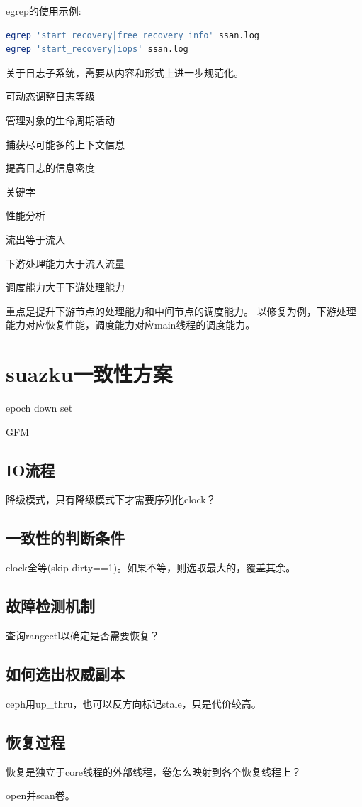 egrep的使用示例:
\begin{lstlisting}[language=bash,frame=single]
egrep 'start_recovery|free_recovery_info' ssan.log
egrep 'start_recovery|iops' ssan.log
\end{lstlisting}

关于日志子系统，需要从内容和形式上进一步规范化。
\begin{enumbox}
\item 可动态调整日志等级
\item 管理对象的生命周期活动
\item 捕获尽可能多的上下文信息
\item 提高日志的信息密度
\item 关键字
\end{enumbox}

性能分析
\begin{enumbox}
\item 流出等于流入
\item 下游处理能力大于流入流量
\item 调度能力大于下游处理能力
\end{enumbox}

重点是提升下游节点的处理能力和中间节点的调度能力。
以修复为例，下游处理能力对应恢复性能，调度能力对应main线程的调度能力。

\section{suazku一致性方案}

epoch down set

GFM

\subsection{IO流程}



降级模式，只有降级模式下才需要序列化clock？

\subsection{一致性的判断条件}

clock全等(skip dirty==1)。如果不等，则选取最大的，覆盖其余。

\subsection{故障检测机制}

查询rangectl以确定是否需要恢复？

\subsection{如何选出权威副本}

ceph用up\_thru，也可以反方向标记stale，只是代价较高。

\subsection{恢复过程}

恢复是独立于core线程的外部线程，卷怎么映射到各个恢复线程上？

open并scan卷。

